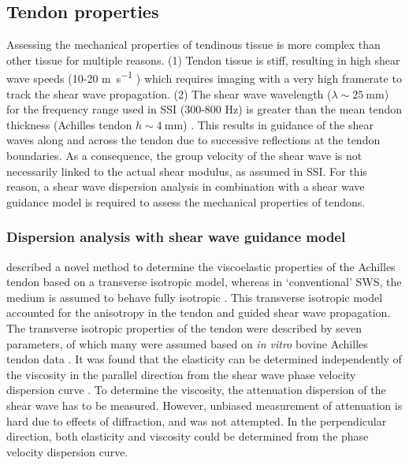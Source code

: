 



\subsection{Tendon properties}
Assessing the mechanical properties of tendinous tissue is more complex than other tissue for multiple reasons. (1) Tendon tissue is stiff, resulting in high shear wave speeds (10-20 \si{\meter\per\second} \cite{cortes_continuous_2015, helfenstein-didier_vivo_2016}) which requires imaging with a very high framerate to track the shear wave propagation. (2) The shear wave wavelength ($\lambda {\sim}\SI{25}{\milli\meter}$) for the frequency range used in SSI (300-800 \si{\hertz}) is greater than the mean tendon thickness (Achilles tendon $h{\sim}\SI{4}{\milli\meter}$) \cite{brum_vivo_2014}. This results in guidance of the shear waves along and across the tendon due to successive reflections at the tendon boundaries. As a consequence, the group velocity of the shear wave is not necessarily linked to the actual shear modulus, as assumed in SSI. For this reason, a shear wave dispersion analysis in combination with a shear wave guidance model is required to assess the mechanical properties of tendons. 

\subsubsection{Dispersion analysis with shear wave guidance model}
\citeauthor{brum_vivo_2014} described a novel method to determine the viscoelastic properties of the Achilles tendon based on a transverse isotropic model, whereas in `conventional' SWS, the medium is assumed to behave fully isotropic \cite{brum_vivo_2014}. This transverse isotropic model accounted for the anisotropy in the tendon and guided shear wave propagation. The transverse isotropic properties of the tendon were described by seven parameters, of which many were assumed based on \textit{in vitro} bovine Achilles tendon data \cite{kuo_elastic_2001}. It was found that the elasticity can be determined independently of the viscosity in the parallel direction from the shear wave phase velocity dispersion curve \cite{nguyen_assessment_2011, brum_vivo_2014}. To determine the viscosity, the attenuation dispersion of the shear wave has to be measured. However, unbiased measurement of attenuation is hard due to effects of diffraction, and was not attempted. In the perpendicular direction, both elasticity and viscosity could be determined from the phase velocity dispersion curve. 

